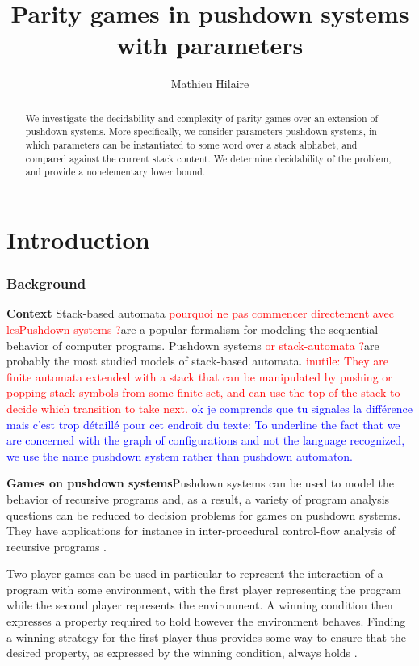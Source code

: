 \documentclass[a4paper,UKenglish,cleveref, autoref, thm-restate]{lipics-v2021}
\title{Parity games in pushdown systems with parameters}
\author{Mathieu Hilaire}{Université Paris-Saclay\and
CNRS\and
ENS Paris-Saclay\and
Laboratoire Méthodes Formelles (LMF)\and
Gif-sur-Yvette, France
}{hilaire@lsv.fr}{}{This work was partly done while the author was supported by the 
Agence Nationale de la Recherche grant no.  ANR-17-CE40-0010.}
\begin{document}
\maketitle


\begin{abstract}
	We investigate the decidability and complexity of
	parity games over an extension of pushdown systems.
	More specifically, we consider parameters pushdown systems, in
	which parameters can be instantiated to some word over a stack alphabet,
	and compared against the current stack content.
	We determine decidability of the problem, and provide a nonelementary lower bound. 
\end{abstract}

\section{Introduction}

\subsubsection*{Background}


{\bf Context}
Stack-based automata \textcolor{red}{pourquoi ne pas commencer directement avec lesPushdown systems ?}are a popular formalism for modeling the sequential behavior of computer programs. 
Pushdown systems \textcolor{red}{or stack-automata ?}are probably the most studied models of stack-based automata.
\textcolor{red}{inutile: They are
finite automata 
 extended with a stack that can be manipulated by pushing or popping stack symbols from some finite set, and can use the top of the stack to decide which transition to take next.}
\textcolor{blue}{ok je comprends que tu signales la différence mais c'est trop détaillé pour cet endroit du texte: To underline the fact that we are concerned with the graph of configurations and not the language recognized, we use the name pushdown system rather than pushdown automaton.}

{\bf Games on pushdown systems}Pushdown systems can be used to model the behavior of recursive programs and,
as a result, a variety of 
 program analysis questions can be reduced to decision problems for games on pushdown systems.
They have applications for instance in inter-procedural control-flow analysis of recursive programs \cite{esparza1999automata, reps2005weighted}.





Two player games can be used in particular to
 represent the
interaction of a program with some environment, with the first player representing the program while the second player represents the environment. A winning condition then expresses a property required to hold however the environment behaves. Finding a winning strategy for the first player
thus provides some way 
 to ensure that the desired 
property, as expressed by the winning condition,
always holds \cite{arnold2003games}.
\end{document}
